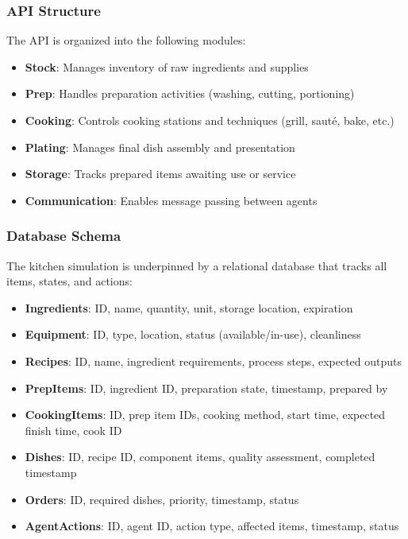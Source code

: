 \documentclass{article}
\begin{document}
\subsubsection{API Structure}
The API is organized into the following modules:

\begin{itemize}
    \item \textbf{Stock}: Manages inventory of raw ingredients and supplies
    \item \textbf{Prep}: Handles preparation activities (washing, cutting, portioning)
    \item \textbf{Cooking}: Controls cooking stations and techniques (grill, sauté, bake, etc.)
    \item \textbf{Plating}: Manages final dish assembly and presentation
    \item \textbf{Storage}: Tracks prepared items awaiting use or service
    \item \textbf{Communication}: Enables message passing between agents
\end{itemize}

\subsubsection{Database Schema}
The kitchen simulation is underpinned by a relational database that tracks all items, states, and actions:

\begin{itemize}
    \item \textbf{Ingredients}: ID, name, quantity, unit, storage location, expiration
    \item \textbf{Equipment}: ID, type, location, status (available/in-use), cleanliness
    \item \textbf{Recipes}: ID, name, ingredient requirements, process steps, expected outputs
    \item \textbf{PrepItems}: ID, ingredient ID, preparation state, timestamp, prepared by
    \item \textbf{CookingItems}: ID, prep item IDs, cooking method, start time, expected finish time, cook ID
    \item \textbf{Dishes}: ID, recipe ID, component items, quality assessment, completed timestamp
    \item \textbf{Orders}: ID, required dishes, priority, timestamp, status
    \item \textbf{AgentActions}: ID, agent ID, action type, affected items, timestamp, status
\end{itemize}
\end{document}

